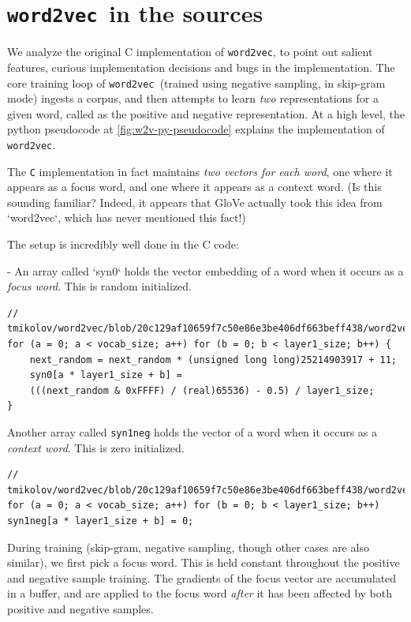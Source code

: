 \documentclass[11pt]{book}
\newcommand{\wtov}{\texttt{word2vec }}
\begin{document}
\section{\wtov in the sources}

We analyze the original C implementation of \texttt{word2vec}, to point out salient
features, curious implementation decisions and bugs in the implementation.
The core training loop of \wtov (trained using negative sampling, in skip-gram
mode) ingests a corpus, and then attempts to learn \emph{two} representations for a given word, called as the positive and negative representation. At a high level,
the python pseudocode at \autoref{fig:w2v-py-pseudocode} explains the implementation of \texttt{word2vec}.

The \texttt{C} implementation in fact maintains \emph{two vectors for each word}, one where
it appears as a focus word, and one where it appears as a context word.
(Is this sounding familiar? Indeed, it appears that GloVe actually took this
idea from `word2vec`, which has never mentioned this fact!)

The setup is incredibly well done in the C code:

- An array called `syn0` holds the vector embedding of a word when it occurs
as a \emph{focus word}. This is random initialized.

\begin{verbatim}
// tmikolov/word2vec/blob/20c129af10659f7c50e86e3be406df663beff438/word2vec.c#L369
for (a = 0; a < vocab_size; a++) for (b = 0; b < layer1_size; b++) {
	next_random = next_random * (unsigned long long)25214903917 + 11;
	syn0[a * layer1_size + b] =
	(((next_random & 0xFFFF) / (real)65536) - 0.5) / layer1_size;
}
\end{verbatim}

Another array called \texttt{syn1neg} holds the vector of a word when it occurs
as a \emph{context word}. This is zero initialized.

\begin{verbatim}
// tmikolov/word2vec/blob/20c129af10659f7c50e86e3be406df663beff438/word2vec.c#L365
for (a = 0; a < vocab_size; a++) for (b = 0; b < layer1_size; b++)
syn1neg[a * layer1_size + b] = 0;
\end{verbatim}

During training (skip-gram, negative sampling, though other cases are
also similar), we first pick a focus word. This is held constant throughout
the positive and negative sample training. The gradients of the focus vector
are accumulated in a buffer, and are applied to the focus word
\emph{after} it has been affected by both positive and negative samples.
\end{document}

